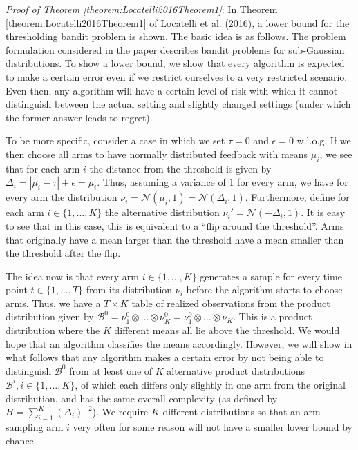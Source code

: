 \documentclass[12pt,]{article}
\begin{document}
\emph{Proof of Theorem \ref{theorem:Locatelli2016Theorem1}}: In Theorem
\ref{theorem:Locatelli2016Theorem1} of Locatelli et al. (2016), a lower
bound for the thresholding bandit problem is shown. The basic idea is as
follows. The problem formulation considered in the paper describes
bandit problems for sub-Gaussian distributions. To show a lower bound,
we show that every algorithm is expected to make a certain error even if
we restrict ourselves to a very restricted scenario. Even then, any
algorithm will have a certain level of risk with which it cannot
distinguish between the actual setting and slightly changed settings
(under which the former answer leads to regret).

To be more specific, consider a case in which we set \(\tau = 0\) and
\(\epsilon = 0\) w.l.o.g. If we then choose all arms to have normally
distributed feedback with means \(\mu_i\), we see that for each arm
\(i\) the distance from the threshold is given by
\(\Delta_i = |\mu_i - \tau| + \epsilon = \mu_i\). Thus, assuming a
variance of 1 for every arm, we have for every arm the distribution
\(\nu_i = \mathcal{N}(\mu_i,1) = \mathcal{N}(\Delta_i,1)\). Furthermore,
define for each arm \(i \in \{1, \dots, K\}\) the alternative
distribution \(\nu_i' = \mathcal{N}(-\Delta_i,1)\). It is easy to see
that in this case, this is equivalent to a ``flip around the
threshold''. Arms that originally have a mean larger than the threshold
have a mean smaller than the threshold after the flip.

The idea now is that every arm \(i \in \{1,\dots,K\}\) generates a
sample for every time point \(t\in \{1, \dots, T\}\) from its
distribution \(\nu_i\) before the algorithm starts to choose arms. Thus,
we have a \(T \times K\) table of realized observations from the product
distribution given by
\(\mathcal{B}^0 = \nu_1^0 \otimes \ldots \otimes \nu_K^0 = \nu_1^0 \otimes \ldots \otimes \nu_K\).
This is a product distribution where the \(K\) different means all lie
above the threshold. We would hope that an algorithm classifies the
means accordingly. However, we will show in what follows that any
algorithm makes a certain error by not being able to distinguish
\(\mathcal{B}^0\) from at least one of \(K\) alternative product
distributions \(\mathcal{B}^i, i \in \{1, \dots, K\}\), of which each
differs only slightly in one arm from the original distribution, and has
the same overall complexity (as defined by
\(H = \sum_{i=1}^K (\Delta_i)^{-2}\)). We require \(K\) different
distributions so that an arm sampling arm \(i\) very often for some
reason will not have a smaller lower bound by chance.
\end{document}
